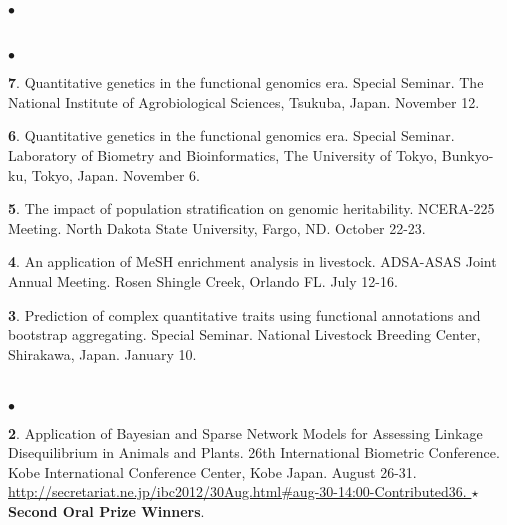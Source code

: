 \documentclass[margin,line,10pt]{res}
\newenvironment{list2}{
  \begin{list}{$\bullet$}{%
      \setlength{\itemsep}{0in}
      \setlength{\parsep}{0in} \setlength{\parskip}{0in}
      \setlength{\topsep}{0in} \setlength{\partopsep}{0in} 
      \setlength{\leftmargin}{0.2in}}}{\end{list}}
\begin{document}
\begin{resume}
\begin{list2}
\end{list2}  

    
\section{}
\begin{list2}

  \item [{\bf 7}.] Quantitative genetics in the functional genomics era. Special Seminar. The National Institute of Agrobiological Sciences, Tsukuba, Japan. November 12. 

  \vspace{0.5cm}

\item [{\bf 6}.] Quantitative genetics in the functional genomics era. Special Seminar. Laboratory of Biometry and Bioinformatics, The University of Tokyo, Bunkyo-ku, Tokyo, Japan. November 6. 

  \vspace{0.5cm}
  
\item [{\bf 5}.] The impact of population stratification on genomic heritability. NCERA-225 Meeting. North Dakota State University, Fargo, ND. October 22-23. 

  \vspace{0.5cm}

\item [{\bf 4}.] An application of MeSH enrichment analysis in livestock. ADSA-ASAS Joint Annual Meeting. Rosen Shingle Creek, Orlando FL. July 12-16.  

  \vspace{0.5cm}
  
\item [{\bf 3}.] Prediction of complex quantitative traits using functional annotations and bootstrap aggregating. Special Seminar. National Livestock Breeding Center, Shirakawa, Japan. January 10. 
\end{list2}  

\section{}
\begin{list2}
\item  [{\bf 2}.] Application of Bayesian and Sparse Network Models for Assessing Linkage Disequilibrium in Animals and Plants. 26th International Biometric Conference. Kobe International Conference Center, Kobe Japan. August 26-31.
  \textcolor{blue}{\href{http://secretariat.ne.jp/ibc2012/30Aug.html\#aug-30-14:00-Contributed36}{http://secretariat.ne.jp/ibc2012/30Aug.html\#aug-30-14:00-Contributed36. } }   {\bf $\star$Second Oral Prize Winners}.
\end{list2}



\end{resume}
\end{document}
